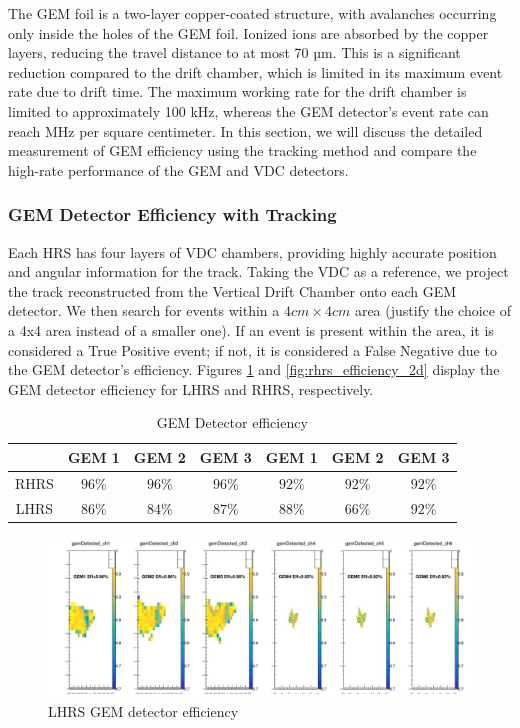 The GEM foil is a two-layer copper-coated structure, with avalanches occurring only inside the holes of the GEM foil. Ionized ions are absorbed by the copper layers, reducing the travel distance to at most 70 µm. This is a significant reduction compared to the drift chamber, which is limited in its maximum event rate due to drift time. The maximum working rate for the drift chamber is limited to approximately 100 kHz, whereas the GEM detector's event rate can reach MHz per square centimeter. In this section, we will discuss the detailed measurement of GEM efficiency using the tracking method and compare the high-rate performance of the GEM and VDC detectors.

\subsubsection{GEM Detector Efficiency with Tracking}

Each HRS has four layers of VDC chambers, providing highly accurate position and angular information for the track. Taking the VDC as a reference, we project the track reconstructed from the Vertical Drift Chamber onto each GEM detector. We then search for events within a $4 cm \times 4 cm$ area (justify the choice of a 4x4 area instead of a smaller one). If an event is present within the area, it is considered a True Positive event; if not, it is considered a False Negative due to the GEM detector's efficiency. Figures \ref{fig:lhrs_efficiency_2d} and \ref{fig:rhrs_efficiency_2d} display the GEM detector efficiency for LHRS and RHRS, respectively.

\begin{table}[]
    \centering
    \begin{tabular}{c|c|c|c|c|c|c} \hline
         ~ & GEM 1 & GEM 2 & GEM 3 & GEM 1 & GEM 2 & GEM 3 \\ \hline 
         RHRS & $96\%$ & $96\%$ & $96\%$ & $92\%$& $92\%$& $92\%$  \\ \hline
         LHRS & $86\%$& $84\%$ & $87\%$ & $88\%$ & $66\%$ & $92\%$ \\ \hline
    \end{tabular}
    \caption{GEM Detector efficiency}
    \label{tab:gem_detector_efficiency_table}
\end{table}

\begin{figure}[!htbp]
    \centering
    \includegraphics[width=\textwidth]{images/chap5/lhrs_efficiency_2d.png}
    \caption{LHRS GEM detector efficiency}
    \label{fig:lhrs_efficiency_2d}
\end{figure}


